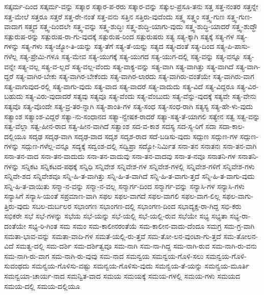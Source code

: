 {ಸತ್ಕರ್ಮ-ದಿಂದ
ಸತ್ಕರ್ಮ-ವನ್ನು
ಸತ್ಕಾರ
ಸತ್ಕಾರ-ಪ-ರರು
ಸತ್ಕಾರ-ವನ್ನು
ಸತ್ಕುಲ-ಪ್ರಸೂ-ತನು
ಸತ್ತ
ಸತ್ತ-ನಂತರ
ಸತ್ತನ್ನೇ
ಸತ್ತ-ಮೇಲೆ
ಸತ್ತರೂ
ಸತ್ತರೆ
ಸತ್ತ-ರೇ-ನಂತೆ
ಸತ್ತ-ವನು
ಸತ್ತಿನ
ಸತ್ತಿರು-ವುದೆಂದು
ಸತ್ತ್ವ
ಸತ್ತ್ವಂ
ಸತ್ತ್ವ-ಗುಣ
ಸತ್ತ್ವ-ಗುಣ-ವಾದಾಗ
ಸತ್ತ್ವದ
ಸತ್ತ್ವ-ದಿಂದಲೇ
ಸತ್ತ್ವ-ವನ್ನು
ಸತ್ತ್ವ-ಶುದ್ಧಿಃ
ಸತ್ತ್ವ-ಶುದ್ಧಿ-ಯಾಗು-ವುದು
ಸತ್ತ್ವ-ಶುದ್ಧಿ-ಯಾದರೆ
ಸತ್ತ್ವ-ಶುದ್ಧೌ
ಸತ್ಪುರುಷ-ರನ್ನು
ಸತ್ಪುರುಷ-ರಾ-ಗು-ವುದಕ್ಕೆ
ಸತ್ಪುರುಷ-ರಿಂದ
ಸತ್ಪುರುಷರು
ಸತ್ಯ
ಸತ್ಯ-ಕ್ಕಾಗಿ
ಸತ್ಯಕ್ಕೆ
ಸತ್ಯ-ಗಳ
ಸತ್ಯ-ಗಳನ್ನು
ಸತ್ಯ-ಗಳು
ಸತ್ಯ-ಜ್ಯೋ-ತಿ-ಯನ್ನು
ಸತ್ಯ-ತೆಗೆ
ಸತ್ಯ-ತೆ-ಯನ್ನು
ಸತ್ಯದ
ಸತ್ಯ-ದಂತೆ
ಸತ್ಯ-ದಿಂದ
ಸತ್ಯ-ಪಿ-ಪಾಸು-ಗಳೆಲ್ಲ
ಸತ್ಯ-ಪ್ರೇಮಿ-ಗಳೂ
ಸತ್ಯ-ಮೇವ
ಸತ್ಯ-ಯುಗಕ್ಕೆ
ಸತ್ಯ-ಯುಗದ
ಸತ್ಯ-ಯುಗ-ದಲ್ಲಿ
ಸತ್ಯ-ವನ್ನು
ಸತ್ಯ-ವನ್ನೂ
ಸತ್ಯ-ವನ್ನೇ
ಸತ್ಯ-ವಲ್ಲ
ಸತ್ಯ-ವ-ಲ್ಲದೆ
ಸತ್ಯ-ವಲ್ಲ-ವೆಂದು
ಸತ್ಯ-ವಾಕ್ಯ-ವನ್ನು
ಸತ್ಯ-ವಾಗಿ
ಸತ್ಯ-ವಾಗಿತ್ತು
ಸತ್ಯ-ವಾಗಿದೆ
ಸತ್ಯ-ವಾಗಿ-ದ್ದರೆ
ಸತ್ಯ-ವಾಗಿರ-ಬೇಕು
ಸತ್ಯ-ವಾಗಿರ-ಬೇಕೆಂದು
ಸತ್ಯ-ವಾಗಿರ-ಲಾರದು
ಸತ್ಯ-ವಾಗಿರು-ವಂತೆಯೇ
ಸತ್ಯ-ವಾಗಿರು-ವಾಗ
ಸತ್ಯ-ವಾಗುವುದ-ರಲ್ಲಿ
ಸತ್ಯ-ವಾಗು-ವುದು
ಸತ್ಯ-ವಾದ
ಸತ್ಯ-ವಾದರೆ
ಸತ್ಯ-ವಾದುದು
ಸತ್ಯ-ವಿದೆ
ಸತ್ಯ-ವಿದ್ದರೂ
ಸತ್ಯ-ವಿರ-ಬಹುದು
ಸತ್ಯ-ವಿರು-ವುದಾದರೆ
ಸತ್ಯವು
ಸತ್ಯವೂ
ಸತ್ಯ-ವೆಂದು
ಸತ್ಯ-ವೆಂಬುದು
ಸತ್ಯ-ವೆನ್ನು-ವುದಕ್ಕೆ
ಸತ್ಯವೇ
ಸತ್ಯ-ವೇನು
ಸತ್ಯವೊ
ಸತ್ಯ-ವೊಂದೇ
ಸತ್ಯ-ವ್ರ-ತರ-ನ್ನಾಗಿ
ಸತ್ಯ-ಶಾಂತಿ-ಗಳ
ಸತ್ಯ-ಸಂಧ
ಸತ್ಯ-ಸಂಧ-ರಾಗಿ
ಸತ್ಯಸ್ಯ
ಸತ್ಯ-ಹೇ-ಳು-ವುದು
ಸತ್ಯಾಂಶ
ಸತ್ಯಾಂಶ-ವಿದ್ದರೆ
ಸತ್ಯಾ-ನು-ಸಂಧಾನದ
ಸತ್ಯಾ-ನ್ವೇಷಕ-ರಾದರೆ
ಸತ್ಯಾ-ಸತ್ಯ-ತೆ-ಯಾಗಲಿ
ಸತ್ಯೇನ
ಸತ್ವ
ಸತ್ವ-ವನ್ನು
ಸತ್ವ-ವೆಲ್ಲಾ
ಸತ್ವ-ಹೀನ-ರಾದ
ಸತ್ವ-ಹೀನ-ವಾಗಿದೆ
ಸತ್ವಾಂಶ
ಸದ-ವ-ಕಾಶ
ಸದಸ್ಯ
ಸದ-ಸ್ಯ-ರಿಗೆ
ಸದಾ
ಸದಾ-ಕಾಲ-ದಲ್ಲಿಯೂ
ಸದೃಢ
ಸದೃಢ-ವಾಗಿ
ಸದೃಢ-ವಾದ
ಸದೃಶ
ಸದೃಶ-ರಾದ
ಸದೆ-ಬಡಿಸು-ವುದು
ಸದ್ಗುಣ
ಸದ್ಗುಣ-ಗಳ
ಸದ್ಗುಣ-ಗಳನ್ನು
ಸದ್ಗುಣ-ಗಳೆಲ್ಲ-ವನ್ನೂ
ಸದ್ಯಕ್ಕೆ
ಸದ್ವಂಶ-ದಲ್ಲಿ
ಸದ್ವಿಪ್ರಾ
ಸದ್ಯೋ-ನಿರ್ಮಿತ
ಸನಾ-ತನ
ಸನಾತನಃ
ಸನಾ-ತನ-ವಾಗಿ
ಸನಾ-ತನ-ವಾದ
ಸನಾ-ತನ-ವಾದುದು
ಸನಾ-ತನ-ವಾದುವು
ಸನಾ-ತನ-ವಾದವು
ಸನಾ-ತ-ನವೂ
ಸನಾತನಿ-ಗಳ
ಸನಾತನಿ-ಗಳನ್ನು
ಸನ್ನಿಕಟ
ಸನ್ನಿಕಟದ-ಪಥಕ್ಕೆ
ಸನ್ನಿಧಿ
ಸನ್ನಿವೇಶ
ಸನ್ನಿವೇಶ-ಗಳ
ಸನ್ನಿವೇಶ-ಗಳಲ್ಲಿ
ಸನ್ನಿವೇಶ-ಗಳಿಗೆ
ಸನ್ನಿವೇಶ-ಗಳು
ಸನ್ನಿವೇ-ಶದ
ಸನ್ನಿವೇಶವೂ
ಸನ್ನಿ-ಹಿ-ತ-ವಾಗಿತ್ತು
ಸನ್ನಿ-ಹಿ-ತ-ವಾಗಿದೆ
ಸನ್ನಿ-ಹಿ-ತ-ವಾಗು-ತ್ತದೆ
ಸನ್ನಿ-ಹಿ-ತ-ವಾಗು-ವುದು
ಸನ್ನಿ-ಹಿ-ತ-ವಾಯಿತು
ಸನ್ಮಾ-ನ-ವನ್ನು
ಸನ್ಮಾ-ನ-ವಲ್ಲ
ಸನ್ಮಾರ್ಗ-ದಿಂದ
ಸನ್ಮಾರ್ಗ-ವನ್ನು
ಸನ್ಯಾಸಿ-ಗಳ
ಸನ್ಯಾಸಿ-ಗಳು
ಸನ್ಯಾಸಿಗೆ
ಸನ್ಯಾಸಿ-ಯಂತೆ
ಸಪ್ರಮಾಣ-ವಾಗಿ
ಸಫಲ
ಸಫಲ-ವಾಗದೆ
ಸಫಲ-ವಾಗಲಿ
ಸಫಲ-ವಾಗ-ಲಿಲ್ಲ
ಸಫಲ-ವಾಗು-ತ್ತಿರು-ವುದು
ಸಬಲ-ದುರ್ಬಲರ
ಸಭಾಂಗಣ
ಸಭಾಂಗಣ-ದಲ್ಲಿ
ಸಭಾಂಗಣ-ದಿಂದ
ಸಭಾದ್ಯಕ್ಷ-ರಾ-ಗಿದ್ದ
ಸಭಿ-ಕರು
ಸಭಿಕರೇ
ಸಭೆ
ಸಭೆ-ಗಳನ್ನು
ಸಭೆಯ
ಸಭೆ-ಯನ್ನು
ಸಭೆ-ಯಲ್ಲಿ
ಸಭೆ-ಯಲ್ಲಿ-ರುವ
ಸಭೆಯೇ
ಸಭ್ಯ
ಸಭ್ಯತಾ
ಸಭ್ಯ-ರಾ-ದಂತೆಯೇ
ಸಭ್ಯ-ರಿ-ಗಿಂತ
ಸಮ
ಸಮಂ
ಸಮ-ಕಾಲೀನರಂತೆಯೆ
ಸಮ-ಕಾಲೀನ-ವಾದು-ದೆಂದೂ
ಸಮಗ್ರ
ಸಮ-ಗ್ರ-ವಾಗಿ
ಸಮತಾ-ಭಾವ-ವನ್ನು
ಸಮತಾ-ವಾದಿ-ಗಳ
ಸಮತೆ-ಯಲ್ಲಿ-ರು-ತ್ತವೆ
ಸಮ-ತೋ-ಲನ-ವುಂಟಾ-ಗು-ತ್ತದೆ
ಸಮ-ತೋಲನ-ವಿದೆ
ಸಮತ್ವ-ದಲ್ಲಿ
ಸಮ-ದರ್ಶಿ
ಸಮ-ದರ್ಶಿತ್ವವೂ
ಸಮ-ನಾಗಿ
ಸಮ-ನಾ-ಗಿದ್ದ
ಸಮ-ನಾಗಿ-ರುವ
ಸಮ-ನಾಗಿ-ರು-ವನು
ಸಮ-ನಾಗಿ-ರು-ವಾಗ
ಸಮ-ನಾಗಿ-ರು-ವುವು
ಸಮ-ನಾದ
ಸಮನ್ವಯ
ಸಮನ್ವಯ-ಗೊಳಿ-ಸಲು
ಸಮನ್ವಯ-ಗೊಳಿ-ಸುವಂಥದು
ಸಮನ್ವಯ-ಗೊಳಿಸು-ವಷ್ಟು
ಸಮನ್ವಯ-ಗೊಳಿಸು-ವುದು
ಸಮನ್ವಯ-ತೆ-ಯನ್ನು
ಸಮನ್ವಯ-ಮೂರ್ತಿ
ಸಮನ್ವಯಾ-ಚಾರ್ಯ-ನಾದ
ಸಮನ್ವಿತ-ವಾದ
ಸಮಯ
ಸಮಯಕ್ಕೆ
ಸಮಯ-ಗಳಲ್ಲಿ
ಸಮಯ-ಗಳು
ಸಮಯದ
ಸಮಯ-ದಲ್ಲಿ
ಸಮಯ-ದಲ್ಲಿಯೂ
}
